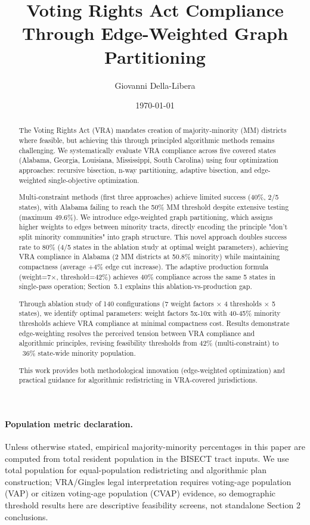 \documentclass[12pt]{article}
\title{Voting Rights Act Compliance Through Edge-Weighted Graph Partitioning}
\author{Giovanni Della-Libera}
\date{\today}
\begin{document}
\maketitle

\begin{abstract}
The Voting Rights Act (VRA) mandates creation of majority-minority (MM) districts where feasible, but achieving this through principled algorithmic methods remains challenging. We systematically evaluate VRA compliance across five covered states (Alabama, Georgia, Louisiana, Mississippi, South Carolina) using four optimization approaches: recursive bisection, n-way partitioning, adaptive bisection, and edge-weighted single-objective optimization.

Multi-constraint methods (first three approaches) achieve limited success (40\%, 2/5 states), with Alabama failing to reach the 50\% MM threshold despite extensive testing (maximum 49.6\%). We introduce edge-weighted graph partitioning, which assigns higher weights to edges between minority tracts, directly encoding the principle "don't split minority communities" into graph structure. This novel approach doubles success rate to 80\% (4/5 states in the ablation study at optimal weight parameters), achieving VRA compliance in Alabama (2 MM districts at 50.8\% minority) while maintaining compactness (average +4\% edge cut increase). The adaptive production formula (weight=7×, threshold=42\%) achieves 40\% compliance across the same 5 states in single-pass operation; Section~5.1 explains this ablation-vs-production gap.

Through ablation study of 140 configurations (7 weight factors × 4 thresholds × 5 states), we identify optimal parameters: weight factors 5x-10x with 40-45\% minority thresholds achieve VRA compliance at minimal compactness cost. Results demonstrate edge-weighting resolves the perceived tension between VRA compliance and algorithmic principles, revising feasibility thresholds from 42\% (multi-constraint) to ~36\% state-wide minority population.

This work provides both methodological innovation (edge-weighted optimization) and practical guidance for algorithmic redistricting in VRA-covered jurisdictions.
\end{abstract}

\paragraph{Population metric declaration.} Unless otherwise stated, empirical majority-minority percentages in this paper are computed from total resident population in the BISECT tract inputs. We use total population for equal-population redistricting and algorithmic plan construction; VRA/Gingles legal interpretation requires voting-age population (VAP) or citizen voting-age population (CVAP) evidence, so demographic threshold results here are descriptive feasibility screens, not standalone Section 2 conclusions.
\end{document}
